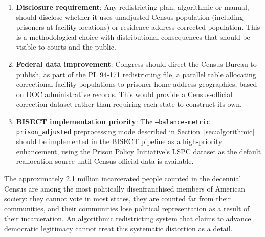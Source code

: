 \begin{enumerate}
    \item \textbf{Disclosure requirement}: Any redistricting plan, algorithmic or manual, should disclose whether it uses unadjusted Census population (including prisoners at facility locations) or residence-address-corrected population. This is a methodological choice with distributional consequences that should be visible to courts and the public.

    \item \textbf{Federal data improvement}: Congress should direct the Census Bureau to publish, as part of the PL 94-171 redistricting file, a parallel table allocating correctional facility populations to prisoner home-address geographies, based on DOC administrative records. This would provide a Census-official correction dataset rather than requiring each state to construct its own.

    \item \textbf{BISECT implementation priority}: The \texttt{--balance-metric prison\_adjusted} preprocessing mode described in Section~\ref{sec:algorithmic} should be implemented in the BISECT pipeline as a high-priority enhancement, using the Prison Policy Initiative's LSPC dataset as the default reallocation source until Census-official data is available.
\end{enumerate}

The approximately 2.1 million incarcerated people counted in the decennial Census are among the most politically disenfranchised members of American society: they cannot vote in most states, they are counted far from their communities, and their communities lose political representation as a result of their incarceration. An algorithmic redistricting system that claims to advance democratic legitimacy cannot treat this systematic distortion as a detail.
